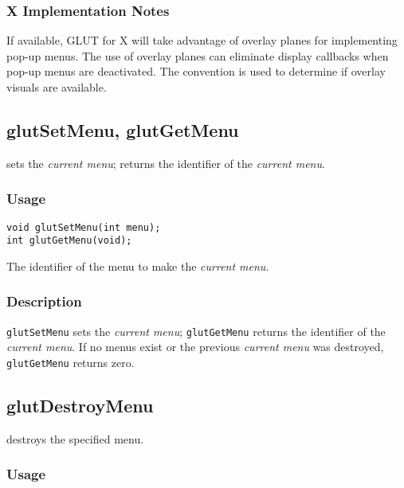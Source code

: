 \subsubsection*{X Implementation Notes}

If available, GLUT for X will take advantage of overlay planes
for implementing pop-up menus.  The use of overlay planes can
eliminate display callbacks when pop-up menus are deactivated.
The  convention \cite{kilgard93-layers} is used to
determine if overlay visuals are available.

\subsection{glutSetMenu, glutGetMenu}

 sets the {\em current menu};  returns the
identifier of the {\em current menu}.

\subsubsection*{Usage}

\begin{verbatim}
void glutSetMenu(int menu);
int glutGetMenu(void);
\end{verbatim}
\begin{description}
\itemsep 0in
\item[{\tt menu}]
The identifier of the menu to make the {\em current menu}.
\end{description}

\subsubsection*{Description}

{\tt glutSetMenu} sets the {\em current menu}; {\tt glutGetMenu} returns the
identifier of the {\em current menu}.
If no menus exist or the previous {\em current menu} was destroyed,
{\tt glutGetMenu} returns zero.

\subsection{glutDestroyMenu}

 destroys the specified menu.

\subsubsection*{Usage}

